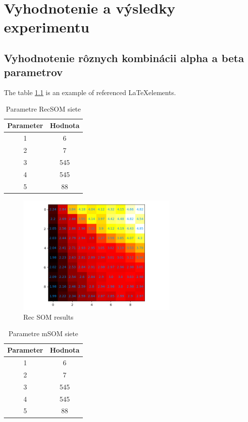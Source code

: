\chapter{Vyhodnotenie a výsledky experimentu}


\section{Vyhodnotenie rôznych kombinácii alpha a beta parametrov}

The table \ref{table:1} is an example of referenced \LaTeX elements.
 
\begin{table}[h!]
\centering
\begin{tabular}{|c|c|} 
 \hline
 Parameter & Hodnota \\ 
 \hline\hline
 1 & 6  \\ 
 \hline
 2 & 7   \\
 \hline
 3 & 545  \\
 \hline
 4 & 545  \\
 \hline
 5 & 88 \\  
 \hline
\end{tabular}
\caption{Parametre RecSOM siete}
\label{table:1}
\end{table}


\begin{figure}[H]
    \centering
    \includegraphics[width=8cm]{assets/recsom_abcd}
    \caption{Rec SOM results}
\end{figure}


\begin{table}[h!]
    \centering
    \begin{tabular}{|c|c|} 
     \hline
     Parameter & Hodnota \\ 
     \hline\hline
     1 & 6  \\ 
     \hline
     2 & 7   \\
     \hline
     3 & 545  \\
     \hline
     4 & 545  \\
     \hline
     5 & 88 \\  
     \hline
    \end{tabular}
    \caption{Parametre mSOM siete}
    \label{table:2}
\end{table}

